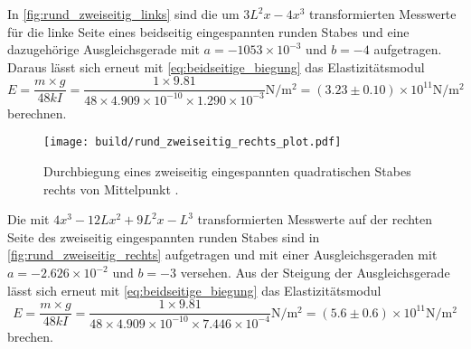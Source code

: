 \noindent In \autoref{fig:rund_zweiseitig_links} sind die um $3L^2x-4x^3$ transformierten Messwerte für die linke Seite eines beidseitig eingespannten runden Stabes und eine dazugehörige Ausgleichsgerade mit $a=-1053\times 10^{-3}$ und $b=-4$ aufgetragen.  Daraus lässt sich erneut mit \autoref{eq:beidseitige_biegung} das Elastizitätsmodul
\begin{equation*}
  E=\frac{m \times g}{48kI} = \frac{1 \times 9.81}{48 \times 4.909 \times 10^{-10} \times 1.290 \times 10^{-3}} \unit{\newton\per\meter\squared} = (3.23 \pm 0.10) \times 10^{11} \unit{\newton\per\meter\squared}
\end{equation*}
\noindent berechnen.

\begin{figure}[H]
  \centering
  \texttt{[image: build/rund\_zweiseitig\_rechts\_plot.pdf]}
  \caption{Durchbiegung eines zweiseitig eingespannten quadratischen Stabes rechts von Mittelpunkt \cite{V103}.}
  \label{fig:rund_zweiseitig_rechts}
\end{figure}

\noindent Die mit $4x^3-12Lx^2+9L^2x-L^3$ transformierten Messwerte auf der rechten Seite des zweiseitig eingespannten runden Stabes sind in \autoref{fig:rund_zweiseitig_rechts} aufgetragen und mit einer Ausgleichsgeraden mit $a=-2.626\times 10^{-2}$ und $b=-3$ versehen.
\noindent Aus der Steigung der Ausgleichsgerade lässt sich erneut mit \autoref{eq:beidseitige_biegung} das Elastizitätsmodul
\begin{equation*}
  E=\frac{m \times g}{48kI} = \frac{1 \times 9.81}{48 \times 4.909 \times 10^{-10} \times 7.446 \times 10^{-4}} \unit{\newton\per\meter\squared} = (5.6 \pm 0.6) \times 10^{11} \unit{\newton\per\meter\squared}
\end{equation*}
\noindent brechen.